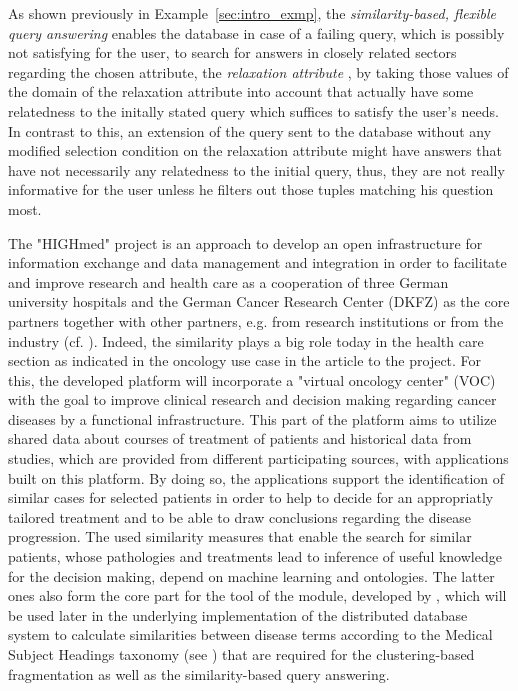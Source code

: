 As shown previously in Example~\ref{sec:intro_exmp}, the \emph{similarity-based, flexible query answering} \citep{Wiese2014} enables the database in case 
of a failing query, which is possibly not satisfying for the user, to search for answers in closely related sectors regarding the chosen attribute, 
the \emph{relaxation attribute} \citep{Wiese2014}, by taking those values of the domain of the relaxation attribute into account that actually have some 
relatedness to the initally stated query which suffices to satisfy the user's needs. In contrast to this, an extension of the query sent to the
database without any modified selection condition on the relaxation attribute might have answers that have not necessarily any relatedness to the initial
query, thus, they are not really informative for the user unless he filters out those tuples matching his question most.


The "HIGHmed" project \citep{Haarbrandt2018} is an approach to develop an open infrastructure for information exchange and data management and integration
in order to facilitate and improve research and health care as a cooperation of three German university hospitals and the German Cancer Research Center
(DKFZ) as the core partners together with other partners, e.g. from research institutions or from the industry (cf. \citet[Table~2]{Haarbrandt2018}).
Indeed, the similarity plays a big role today in the health care section as indicated in the oncology use case in the article to the project.
For this, the developed platform will incorporate a "virtual oncology center" (VOC) \citep{Haarbrandt2018} with the goal to improve clinical research and 
decision making regarding cancer diseases by a functional infrastructure. This part of the platform aims to utilize shared data about courses of
treatment of patients and historical data from studies, which are provided from different participating sources, with applications built on this platform.
By doing so, the applications support the identification of similar cases for selected patients in order to help to decide for an appropriatly tailored
treatment and to be able to draw conclusions regarding the disease progression. The used similarity measures that enable the search for similar patients,
whose pathologies and treatments lead to inference of useful knowledge for the decision making, depend on machine learning and ontologies. The latter ones
also form the core part for the tool of the  module, developed by \cite{McInnes2009}, which will be used later in the underlying
implementation of the distributed database system to calculate similarities between disease terms according to the Medical Subject Headings taxonomy 
(see ) that are required for the clustering-based fragmentation as well as the similarity-based query answering.


